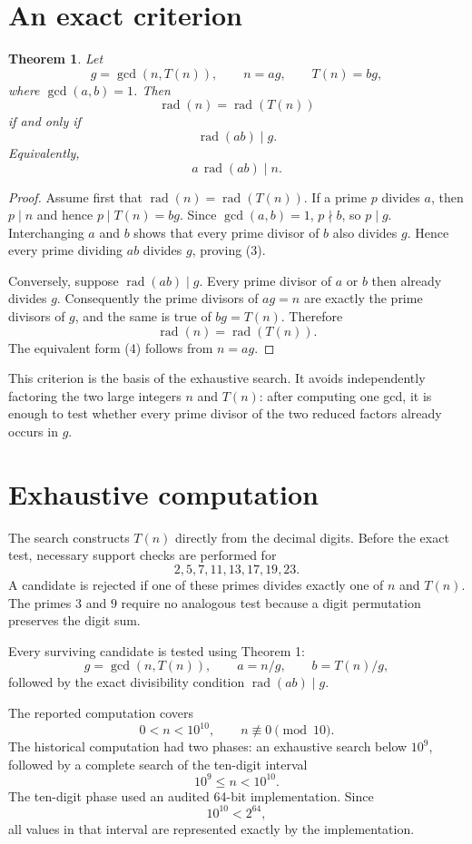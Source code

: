 \documentclass[11pt]{article}
\newtheorem{theorem}{Theorem}
\newcommand{\rad}{\operatorname{rad}}
\begin{document}
\section{An exact criterion}

\begin{theorem}
Let
\[
g=\gcd(n,T(n)),\qquad n=ag,\qquad T(n)=bg,
\]
where \(\gcd(a,b)=1\). Then
\[
\rad(n)=\rad(T(n))
\]
if and only if
\[
\rad(ab)\mid g.
\tag{3}
\]
Equivalently,
\[
a\,\rad(ab)\mid n.
\tag{4}
\]
\end{theorem}

\begin{proof}
Assume first that \(\rad(n)=\rad(T(n))\). If a prime \(p\) divides \(a\), then \(p\mid n\) and hence \(p\mid T(n)=bg\). Since \(\gcd(a,b)=1\), \(p\nmid b\), so \(p\mid g\). Interchanging \(a\) and \(b\) shows that every prime divisor of \(b\) also divides \(g\). Hence every prime dividing \(ab\) divides \(g\), proving (3).

Conversely, suppose \(\rad(ab)\mid g\). Every prime divisor of \(a\) or \(b\) then already divides \(g\). Consequently the prime divisors of \(ag=n\) are exactly the prime divisors of \(g\), and the same is true of \(bg=T(n)\). Therefore
\[
\rad(n)=\rad(T(n)).
\]
The equivalent form (4) follows from \(n=ag\).
\end{proof}

This criterion is the basis of the exhaustive search. It avoids independently factoring the two large integers \(n\) and \(T(n)\): after computing one gcd, it is enough to test whether every prime divisor of the two reduced factors already occurs in \(g\).

\section{Exhaustive computation}

The search constructs \(T(n)\) directly from the decimal digits. Before the exact test, necessary support checks are performed for
\[
2,5,7,11,13,17,19,23.
\]
A candidate is rejected if one of these primes divides exactly one of \(n\) and \(T(n)\). The primes \(3\) and \(9\) require no analogous test because a digit permutation preserves the digit sum.

Every surviving candidate is tested using Theorem 1:
\[
g=\gcd(n,T(n)),\qquad
a=n/g,\qquad
b=T(n)/g,
\]
followed by the exact divisibility condition \(\rad(ab)\mid g\).

The reported computation covers
\[
0<n<10^{10},\qquad n\not\equiv0\pmod {10}.
\]
The historical computation had two phases: an exhaustive search below \(10^9\), followed by a complete search of the ten-digit interval
\[
10^9\le n<10^{10}.
\]
The ten-digit phase used an audited 64-bit implementation. Since
\[
10^{10}<2^{64},
\]
all values in that interval are represented exactly by the implementation.
\end{document}
